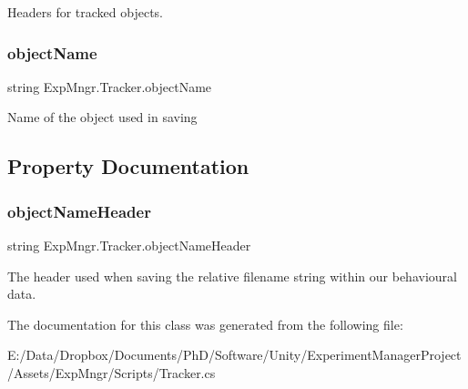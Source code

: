 Headers for tracked objects. 

\mbox{\label{class_exp_mngr_1_1_tracker_a516bea7fe82223da292686f1dc4eadcc}} 
\subsubsection{\texorpdfstring{object\+Name}{objectName}}
{\footnotesize\ttfamily string Exp\+Mngr.\+Tracker.\+object\+Name}



Name of the object used in saving 



\subsection{Property Documentation}
\mbox{\label{class_exp_mngr_1_1_tracker_a574d85b389ddeaf83ae7bf4233491a5b}} 
\subsubsection{\texorpdfstring{object\+Name\+Header}{objectNameHeader}}
{\footnotesize\ttfamily string Exp\+Mngr.\+Tracker.\+object\+Name\+Header\hspace{0.3cm}{\ttfamily [get]}}



The header used when saving the relative filename string within our behavioural data. 



The documentation for this class was generated from the following file\+:\begin{DoxyCompactItemize}
\item 
E\+:/\+Data/\+Dropbox/\+Documents/\+Ph\+D/\+Software/\+Unity/\+Experiment\+Manager\+Project/\+Assets/\+Exp\+Mngr/\+Scripts/Tracker.\+cs\end{DoxyCompactItemize}
